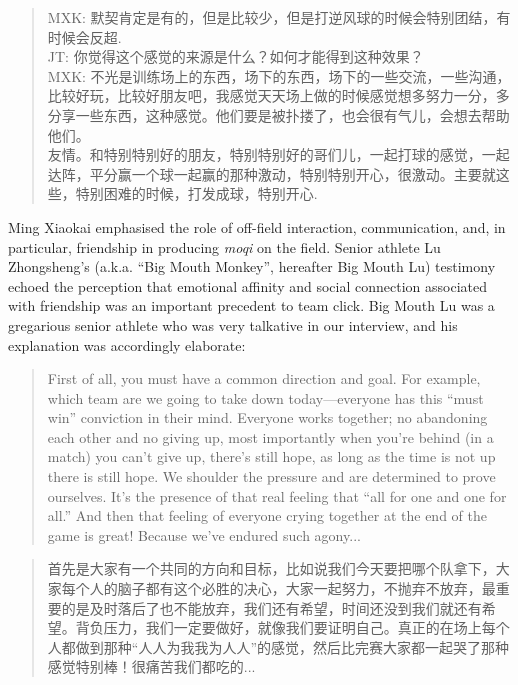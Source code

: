 \begin{CJK}{UTF8}{gbsn}
    \begin{quote}
        MXK: 默契肯定是有的，但是比较少，但是打逆风球的时候会特别团结，有时候会反超. \\
        JT: 你觉得这个感觉的来源是什么？如何才能得到这种效果？\\
        MXK: 不光是训练场上的东西，场下的东西，场下的一些交流，一些沟通，比较好玩，比较好朋友吧，我感觉天天场上做的时候感觉想多努力一分，多分享一些东西，这种感觉。他们要是被扑搂了，也会很有气儿，会想去帮助他们。 \\

友情。和特别特别好的朋友，特别特别好的哥们儿，一起打球的感觉，一起达阵，平分赢一个球一起赢的那种激动，特别特别开心，很激动。主要就这些，特别困难的时候，打发成球，特别开心.
    \end{quote}

Ming Xiaokai emphasised the role of off-field interaction, communication, and, in particular, friendship in producing \textit{moqi} on the field.  Senior athlete Lu Zhongsheng’s (a.k.a. ``Big Mouth Monkey'', hereafter Big Mouth Lu) testimony echoed the perception that emotional affinity and social connection associated with friendship was an important precedent to team click. Big Mouth Lu was a gregarious senior athlete who was very talkative in our interview, and his explanation was accordingly elaborate:

    \begin{quote}
      First of all, you must have a common direction and goal.  For example, which team are we going to take down today---everyone has this ``must win'' conviction in their mind.  Everyone works together; no abandoning each other and no giving up, most importantly when you’re behind (in a match) you can’t give up, there’s still hope, as long as the time is not up there is still hope.  We shoulder the pressure and are determined to prove ourselves.  It's the presence of that real feeling that ``all for one and one for all.''  And then that feeling of everyone crying together at the end of the game is great! Because we've endured such agony...
    \end{quote}

    \begin{quote}
      首先是大家有一个共同的方向和目标，比如说我们今天要把哪个队拿下，大家每个人的脑子都有这个必胜的决心，大家一起努力，不抛弃不放弃，最重要的是及时落后了也不能放弃，我们还有希望，时间还没到我们就还有希望。背负压力，我们一定要做好，就像我们要证明自己。真正的在场上每个人都做到那种“人人为我我为人人”的感觉，然后比完赛大家都一起哭了那种感觉特别棒！很痛苦我们都吃的...
    \end{quote}


\end{CJK}
